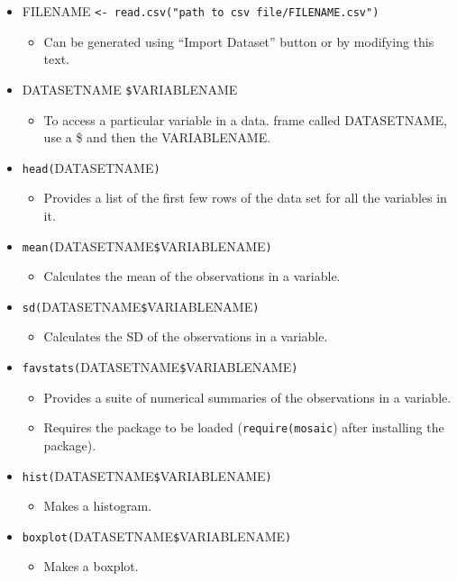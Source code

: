 \documentclass[]{article}
\providecommand{\tightlist}{%
  \setlength{\itemsep}{0pt}\setlength{\parskip}{0pt}}
\begin{document}
\begin{itemize}
\item
  FILENAME
  \texttt{\textless{}-\ read.csv("path\ to\ csv\ file/FILENAME.csv")}

  \begin{itemize}
  \tightlist
  \item
    Can be generated using ``Import Dataset'' button or by modifying
    this text.
  \end{itemize}
\item
  DATASETNAME \texttt{\$}VARIABLENAME

  \begin{itemize}
  \tightlist
  \item
    To access a particular variable in a data. frame called DATASETNAME,
    use a \$ and then the VARIABLENAME.
  \end{itemize}
\item
  \texttt{head(}DATASETNAME\texttt{)}

  \begin{itemize}
  \tightlist
  \item
    Provides a list of the first few rows of the data set for all the
    variables in it.
  \end{itemize}
\item
  \texttt{mean(}DATASETNAME\texttt{\$}VARIABLENAME\texttt{)}

  \begin{itemize}
  \tightlist
  \item
    Calculates the mean of the observations in a variable.
  \end{itemize}
\item
  \texttt{sd(}DATASETNAME\texttt{\$}VARIABLENAME\texttt{)}

  \begin{itemize}
  \tightlist
  \item
    Calculates the SD of the observations in a variable.
  \end{itemize}
\item
  \texttt{favstats(}DATASETNAME\texttt{\$}VARIABLENAME\texttt{)}

  \begin{itemize}
  \item
    Provides a suite of numerical summaries of the observations in a
    variable.
  \item
    Requires the package to be loaded (\texttt{require(mosaic}) after
    installing the package).
  \end{itemize}
\item
  \texttt{hist(}DATASETNAME\texttt{\$}VARIABLENAME\texttt{)}

  \begin{itemize}
  \tightlist
  \item
    Makes a histogram.
  \end{itemize}
\item
  \texttt{boxplot(}DATASETNAME\texttt{\$}VARIABLENAME\texttt{)}

  \begin{itemize}
  \tightlist
  \item
    Makes a boxplot.
  \end{itemize}
\end{itemize}
\end{document}

